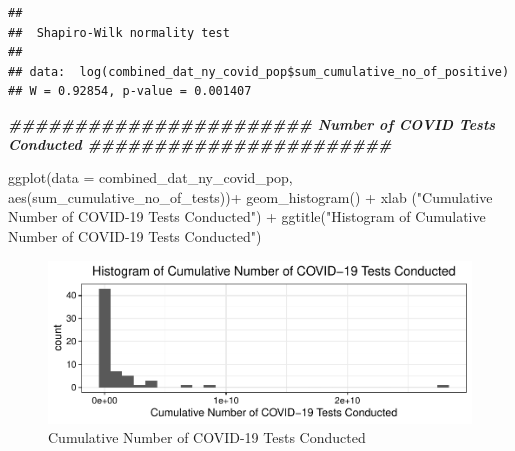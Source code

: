 \documentclass[
  12pt,
]{article}
\newenvironment{Shaded}{\begin{snugshade}}{\end{snugshade}}
\newcommand{\AttributeTok}[1]{\textcolor[rgb]{0.77,0.63,0.00}{#1}}
\newcommand{\CommentTok}[1]{\textcolor[rgb]{0.56,0.35,0.01}{\textit{#1}}}
\newcommand{\DocumentationTok}[1]{\textcolor[rgb]{0.56,0.35,0.01}{\textbf{\textit{#1}}}}
\newcommand{\FunctionTok}[1]{\textcolor[rgb]{0.00,0.00,0.00}{#1}}
\newcommand{\NormalTok}[1]{#1}
\newcommand{\SpecialCharTok}[1]{\textcolor[rgb]{0.00,0.00,0.00}{#1}}
\newcommand{\StringTok}[1]{\textcolor[rgb]{0.31,0.60,0.02}{#1}}
\begin{document}
\begin{Shaded}
\end{Shaded}

\begin{verbatim}
## 
##  Shapiro-Wilk normality test
## 
## data:  log(combined_dat_ny_covid_pop$sum_cumulative_no_of_positive)
## W = 0.92854, p-value = 0.001407
\end{verbatim}

\begin{Shaded}
\begin{Highlighting}[]
\DocumentationTok{\#\#\#\#\#\#\#\#\#\#\#\#\#\#\#\#\#\#\#\#\#\#\# Number of COVID Tests Conducted \#\#\#\#\#\#\#\#\#\#\#\#\#\#\#\#\#\#\#\#\#\#\#}

\FunctionTok{ggplot}\NormalTok{(}\AttributeTok{data =}\NormalTok{ combined\_dat\_ny\_covid\_pop, }\FunctionTok{aes}\NormalTok{(sum\_cumulative\_no\_of\_tests))}\SpecialCharTok{+}
  \FunctionTok{geom\_histogram}\NormalTok{() }\SpecialCharTok{+}
  \FunctionTok{xlab}\NormalTok{ (}\StringTok{"Cumulative Number of COVID{-}19 Tests Conducted"}\NormalTok{) }\SpecialCharTok{+}
  \FunctionTok{ggtitle}\NormalTok{(}\StringTok{"Histogram of Cumulative Number of COVID{-}19 Tests Conducted"}\NormalTok{)}
\end{Highlighting}
\end{Shaded}

\begin{figure}

\includegraphics{EDA_Final_Group_Project_files/figure-latex/unnamed-chunk-6-1} \hfill{}

\caption{Cumulative Number of COVID-19 Tests Conducted}\label{fig:unnamed-chunk-6}
\end{figure}
\end{document}
